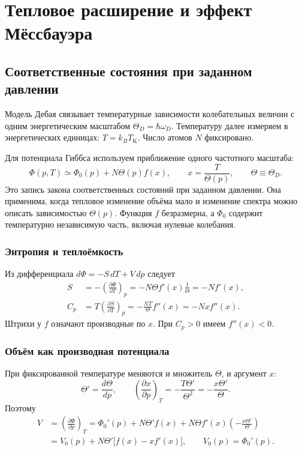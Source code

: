 \documentclass[../final.tex]{subfiles}
\begin{document}
\ifSubfilesClassLoaded{\setcounter{chapter}{6}}{}

\chapter{Тепловое расширение и эффект Мёссбауэра}

\section{Соответственные состояния при заданном давлении}
Модель Дебая связывает температурные зависимости колебательных величин
с одним энергетическим масштабом $\Theta_D=\hbar\omega_D$.
Температуру далее измеряем в энергетических единицах: $T=k_BT_{\mathrm K}$.
Число атомов $N$ фиксировано.

Для потенциала Гиббса используем приближение одного частотного масштаба:
\begin{equation*}
 \Phi(p,T)\simeq\Phi_0(p)+N\Theta(p)f(x),\qquad
 x=\frac{T}{\Theta(p)},\qquad \Theta\equiv\Theta_D.
\end{equation*}
Это запись закона соответственных состояний при заданном давлении.
Она применима, когда тепловое изменение объёма мало и изменение спектра
можно описать зависимостью $\Theta(p)$. Функция $f$ безразмерна,
а $\Phi_0$ содержит температурно независимую часть, включая нулевые колебания.

\subsection{Энтропия и теплоёмкость}
Из дифференциала $d\Phi=-S\,dT+V\,dp$ следует
\begin{align*}
 S&=-\left(\frac{\partial\Phi}{\partial T}\right)_p
 =-N\Theta f'(x)\frac1\Theta=-Nf'(x),\\
 C_p&=T\left(\frac{\partial S}{\partial T}\right)_p
 =-\frac{NT}{\Theta}f''(x)=-Nx f''(x).
\end{align*}
Штрихи у $f$ означают производные по $x$.
При $C_p>0$ имеем $f''(x)<0$.

\subsection{Объём как производная потенциала}
При фиксированной температуре меняются и множитель $\Theta$, и аргумент $x$:
\begin{equation*}
 \Theta'=\frac{d\Theta}{dp},\qquad
 \left(\frac{\partial x}{\partial p}\right)_T
 =-\frac{T\Theta'}{\Theta^2}=-\frac{x\Theta'}\Theta.
\end{equation*}
Поэтому
\begin{align*}
 V&=\left(\frac{\partial\Phi}{\partial p}\right)_T
 =\Phi_0'(p)+N\Theta'f(x)
 +N\Theta f'(x)\left(-\frac{x\Theta'}\Theta\right)\\
 &=V_0(p)+N\Theta'\bigl[f(x)-xf'(x)\bigr],
 \qquad V_0(p)=\Phi_0'(p).
\end{align*}
\end{document}

